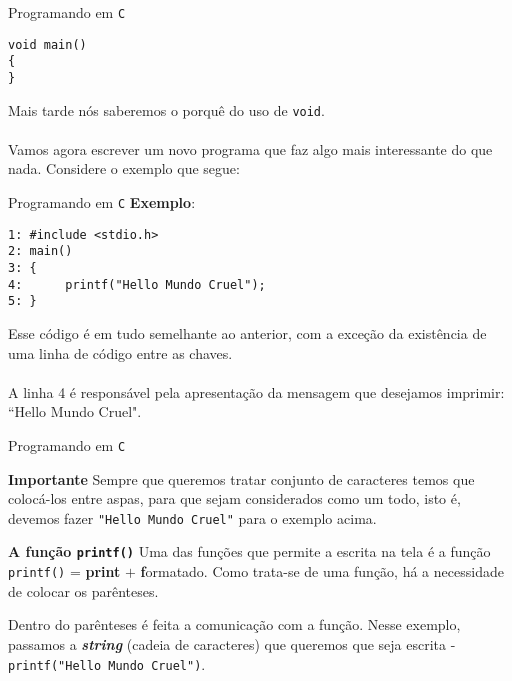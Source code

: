 \documentclass{beamer}
\newcommand{\C}{\texttt{C}}
\begin{document}
\begin{frame}[fragile]{Programando em \C}
\begin{verbatim}
void main()
{
}
\end{verbatim}
\pause Mais tarde nós saberemos o porquê do uso de \texttt{void}.\\~\\

\pause Vamos agora escrever um novo programa que faz algo mais interessante do que nada. Considere o exemplo que segue: 
\end{frame}

\begin{frame}[fragile]{Programando em \C}
\textbf{Exemplo}: 
\begin{verbatim}
1: #include <stdio.h>
2: main()
3: {
4:      printf("Hello Mundo Cruel");
5: }
\end{verbatim}
\pause Esse código é em tudo semelhante ao anterior, com a exceção da existência de uma linha de código entre as chaves.\\~\\

\pause A linha 4 é responsável pela apresentação da mensagem que desejamos imprimir: ``Hello Mundo Cruel".
\end{frame}

\begin{frame}{Programando em \C}
\begin{block}{\textbf{Importante}}
Sempre que queremos tratar conjunto de caracteres temos que colocá-los entre aspas, para que sejam considerados como um todo, isto é, devemos fazer \texttt{"Hello Mundo Cruel"} para o exemplo acima.
\end{block}
\pause \begin{block}{\textbf{A função \texttt{printf()}}}
Uma das funções que permite a escrita na tela é a função \texttt{printf()} = \textbf{print} $+$ \textbf{f}ormatado. Como trata-se de uma função, há a necessidade de colocar os parênteses.	
\end{block}
\pause Dentro do parênteses é feita a comunicação com a função. Nesse exemplo, passamos a \textbf{\textit{string}} (cadeia de caracteres) que queremos que seja escrita - \texttt{printf("Hello Mundo Cruel")}.
\end{frame} 
\end{document}
